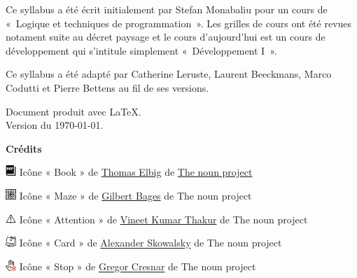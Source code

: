 
\thispagestyle{empty}

Ce syllabus a été écrit initialement par Stefan Monabaliu pour un cours de
«~Logique et techniques de programmation~». Les grilles de cours ont été revues
notament suite au décret paysage et le cours d'aujourd'hui est un cours de
développement qui s'intitule simplement «~Développement I~».

Ce syllabus a été adapté par Catherine Leruste, Laurent Beeckmans, Marco
Codutti et Pierre Bettens au fil de ses versions. 

\bigskip
\noindent
Document produit avec \LaTeX.
\\Version du \today.

\vfill

\textbf{Crédits}

\includegraphics[width=4mm]{icon/definition}
Icône « Book » de 
\href{https://thenounproject.com/dergraph}{Thomas Elbig} de 
\href{https://thenounproject.com}{The noun project}

\includegraphics[width=4mm]{icon/reflexion}
Icône « Maze » de 
\href{https://thenounproject.com/gilbertbages}{Gilbert Bages} de 
The noun project

\includegraphics[width=4mm]{icon/attention}
Icône « Attention » de 
\href{https://thenounproject.com/vkvineet}{Vineet Kumar Thakur} de
The noun project

\includegraphics[width=4mm]{icon/fiche}
Icône « Card » de 
\href{https://thenounproject.com/sandorsz}{Alexander Skowalsky} de
The noun project

\includegraphics[width=4mm]{icon/dont}
Icône « Stop » de 
\href{https://thenounproject.com/grega.cresnar}{Gregor Cresnar} de
The noun project

